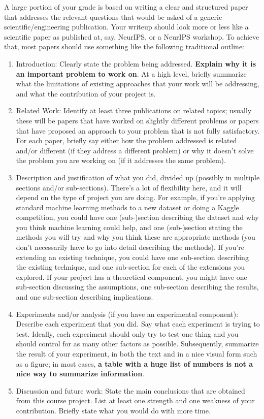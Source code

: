 \documentclass{article}
\begin{document}
A large portion of your grade is based on writing a clear and structured paper that addresses the relevant questions that would be asked of a generic scientific/engineering publication.
Your writeup should look more or less like a scientific paper as published at, say, NeurIPS,
or a NeurIPS workshop.
To achieve that, most papers should use something like the following traditional outline:
\begin{enumerate}
\item Introduction: Clearly state the problem being addressed. \textbf{Explain why it is an important problem to work on}. At a high level, briefly summarize what the limitations of existing approaches that your work will be addressing, and what the contribution of your project is.
\item Related Work: Identify at least three publications on related topics; usually these will be papers that have worked on slightly different problems or papers that have proposed an approach to your problem that is not fully satisfactory. For each paper, briefly say either how the problem addressed is related and/or different (if they address a different problem) or why it doesn't solve the problem you are working on (if it addresses the same problem).
\item Description and justification of what you did, divided up (possibly in multiple sections and/or sub-sections). There's a lot of flexibility here, and it will depend on the type of project you are doing. For example, if you're applying standard machine learning methods to a new dataset or doing a Kaggle competition, you could have one (sub-)section describing the dataset and why you think machine learning could help, and one (sub-)section stating the methods you will try and why you think these are appropriate methods (you don't necessarily have to go into detail describing the methods). If you're extending an existing technique, you could have one sub-section describing the existing technique, and one sub-section for each of the extensions you explored. If your project has a theoretical component, you might have one sub-section discussing the assumptions, one sub-section describing the results, and one sub-section describing implications.
\item Experiments and/or analysis (if you have an experimental component): Describe each experiment that you did. Say what each experiment is trying to test. Ideally, each experiment should only try to test one thing and you should control for as many other factors as possible. Subsequently, summarize the result of your experiment, in both the text and in a nice visual form such as a figure; in most cases, \textbf{a table with a huge list of numbers is not a nice way to summarize information}.
\item Discussion and future work: State the main conclusions that are obtained from this course project. List at least one strength and one weakness of your contribution. Briefly state what you would do with more time.
\end{enumerate}
\end{document}
